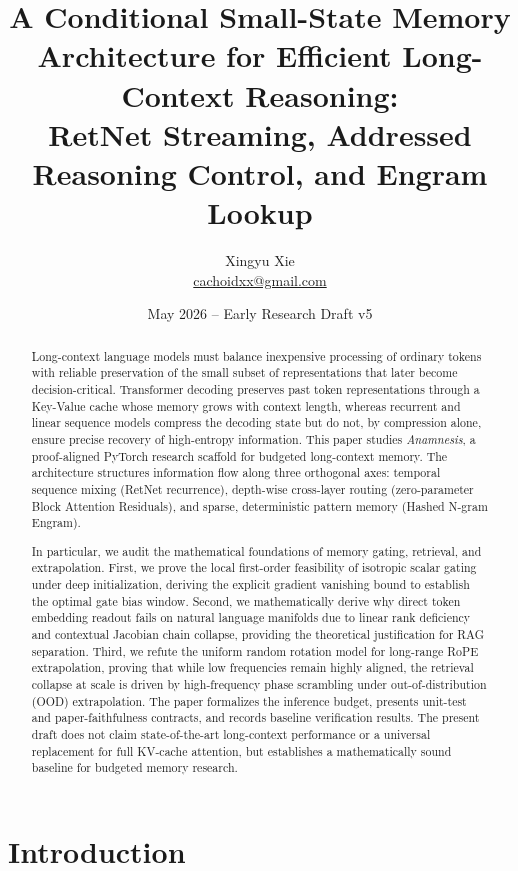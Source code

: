 \documentclass[11pt]{article}
\title{A Conditional Small-State Memory Architecture for Efficient Long-Context Reasoning:\\[0.25em]
\Large RetNet Streaming, Addressed Reasoning Control, and Engram Lookup}
\author{Xingyu Xie \\ \href{mailto:cachoidxx@gmail.com}{cachoidxx@gmail.com}}
\date{May 2026 -- Early Research Draft v5}
\begin{document}
\maketitle

\begin{abstract}
Long-context language models must balance inexpensive processing of ordinary tokens with reliable preservation of the small subset of representations that later become decision-critical. Transformer decoding preserves past token representations through a Key-Value cache whose memory grows with context length, whereas recurrent and linear sequence models compress the decoding state but do not, by compression alone, ensure precise recovery of high-entropy information. This paper studies \emph{Anamnesis}, a proof-aligned PyTorch research scaffold for budgeted long-context memory. The architecture structures information flow along three orthogonal axes: temporal sequence mixing (RetNet recurrence), depth-wise cross-layer routing (zero-parameter Block Attention Residuals), and sparse, deterministic pattern memory (Hashed N-gram Engram). 

In particular, we audit the mathematical foundations of memory gating, retrieval, and extrapolation. First, we prove the local first-order feasibility of isotropic scalar gating under deep initialization, deriving the explicit gradient vanishing bound to establish the optimal gate bias window. Second, we mathematically derive why direct token embedding readout fails on natural language manifolds due to linear rank deficiency and contextual Jacobian chain collapse, providing the theoretical justification for RAG separation. Third, we refute the uniform random rotation model for long-range RoPE extrapolation, proving that while low frequencies remain highly aligned, the retrieval collapse at scale is driven by high-frequency phase scrambling under out-of-distribution (OOD) extrapolation. The paper formalizes the inference budget, presents unit-test and paper-faithfulness contracts, and records baseline verification results. The present draft does not claim state-of-the-art long-context performance or a universal replacement for full KV-cache attention, but establishes a mathematically sound baseline for budgeted memory research.
\end{abstract}

\tableofcontents
\newpage

\section{Introduction}
\end{document}
